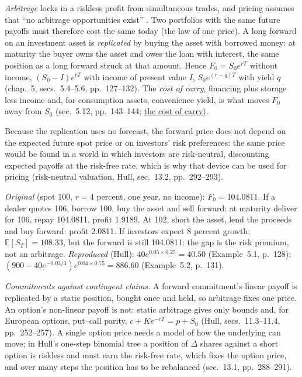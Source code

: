\begin{qfmethod}\label{meth:arbitrage-replication-carry}
 \emph{Arbitrage} locks in a riskless profit from simultaneous trades, and pricing assumes that ``no arbitrage opportunities exist'' \citep[chap.~1, sec.~1.9, p.~39]{s7-hulloptions}. Two portfolios with the same future payoffs must therefore cost the same today (the law of one price). A long forward on an investment asset is \emph{replicated} by buying the asset with borrowed money: at maturity the buyer owns the asset and owes the loan with interest, the same position as a long forward struck at that amount. Hence $F_0=S_0e^{rT}$ without income, $(S_0-I)e^{rT}$ with income of present value $I$, $S_0e^{(r-q)T}$ with yield $q$ (chap.~5, secs.~5.4--5.6, pp.~127--132). The \emph{cost of carry}, financing plus storage less income and, for consumption assets, convenience yield, is what moves $F_0$ away from $S_0$ (sec.~5.12, pp.~143--144; \hyperref[res:cost-of-carry-forward-price]{the cost of carry}).

Because the replication uses no forecast, the forward price does not depend on the expected future spot price or on investors' risk preferences: the same price would be found in a world in which investors are risk-neutral, discounting expected payoffs at the risk-free rate, which is why that device can be used for pricing (risk-neutral valuation, Hull, sec.~13.2, pp.~292--293).

 \emph{Original} (spot 100, $r=4$ percent, one year, no income): $F_0=104.0811$. If a dealer quotes 106, borrow 100, buy the asset and sell forward: at maturity deliver for 106, repay 104.0811, profit 1.9189. At 102, short the asset, lend the proceeds and buy forward: profit 2.0811. If investors expect 8 percent growth, $\mathbb{E}[S_T]=108.33$, but the forward is still 104.0811: the gap is the risk premium, not an arbitrage. \emph{Reproduced} (Hull): $40e^{0.05\times0.25}=40.50$ (Example~5.1, p.~128); $(900-40e^{-0.03/3})e^{0.04\times0.75}=886.60$ (Example~5.2, p.~131).

\emph{Commitments against contingent claims.} A forward commitment's linear payoff is replicated by a static position, bought once and held, so arbitrage fixes one price. An option's non-linear payoff is not: static arbitrage gives only bounds and, for European options, put--call parity, $c+Ke^{-rT}=p+S_0$ (Hull, secs.~11.3--11.4, pp.~252--257). A single option price needs a model of how the underlying can move; in Hull's one-step binomial tree a position of $\Delta$ shares against a short option is riskless and must earn the risk-free rate, which fixes the option price, and over many steps the position has to be rebalanced (sec.~13.1, pp.~288--291).


\end{qfmethod}
